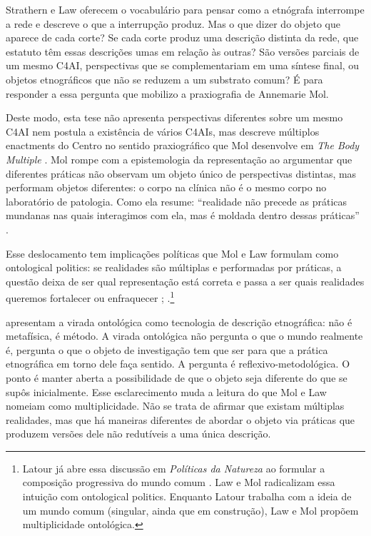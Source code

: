 \vspace{0.5cm}

Strathern e Law oferecem o vocabulário para pensar como a etnógrafa interrompe a rede e descreve o que a interrupção produz. Mas o que dizer do objeto que aparece de cada corte? Se cada corte produz uma descrição distinta da rede, que estatuto têm essas descrições umas em relação às outras? São versões parciais de um mesmo C4AI, perspectivas que se complementariam em uma síntese final, ou objetos etnográficos que não se reduzem a um substrato comum? É para responder a essa pergunta que mobilizo a praxiografia de Annemarie Mol.

Deste modo, esta tese não apresenta perspectivas diferentes sobre um mesmo C4AI nem postula a existência de vários C4AIs, mas descreve múltiplos enactments do Centro no sentido praxiográfico que Mol desenvolve em \textit{The Body Multiple} \parencite{mol2002body}. Mol rompe com a epistemologia da representação ao argumentar que diferentes práticas não observam um objeto único de perspectivas distintas, mas performam objetos diferentes: o corpo na clínica não é o mesmo corpo no laboratório de patologia. Como ela resume: ``realidade não precede as práticas mundanas nas quais interagimos com ela, mas é moldada dentro dessas práticas'' \parencite[p.~6]{mol2002body}.

Esse deslocamento tem implicações políticas que Mol e Law formulam como ontological politics: se realidades são múltiplas e performadas por práticas, a questão deixa de ser qual representação está correta e passa a ser quais realidades queremos fortalecer ou enfraquecer \parencite[pp.~74--75]{mol1999ontological}; \parencite{Law2004After}.\footnote{Latour já abre essa discussão em \textit{Políticas da Natureza} ao formular a composição progressiva do mundo comum \parencite[p.~18]{latour2004politics}. Law e Mol radicalizam essa intuição com ontological politics. Enquanto Latour trabalha com a ideia de um mundo comum (singular, ainda que em construção), Law e Mol propõem multiplicidade ontológica.}

\textcite{holbraad2017ontological} apresentam a virada ontológica como tecnologia de descrição etnográfica: não é metafísica, é método. A virada ontológica não pergunta o que o mundo realmente é, pergunta o que o objeto de investigação tem que ser para que a prática etnográfica em torno dele faça sentido. A pergunta é reflexivo-metodológica. O ponto é manter aberta a possibilidade de que o objeto seja diferente do que se supôs inicialmente. Esse esclarecimento muda a leitura do que Mol e Law nomeiam como multiplicidade. Não se trata de afirmar que existam múltiplas realidades, mas que há maneiras diferentes de abordar o objeto via práticas que produzem versões dele não redutíveis a uma única descrição.

